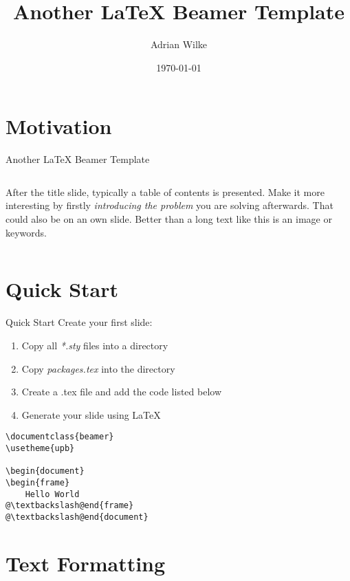 \documentclass{beamer}
\author[A.~Wilke]{Adrian Wilke}
\institute[dice]{DICE Group\\Paderborn University}
\title[Another LaTeX Beamer Template]{Another LaTeX Beamer Template}
\subtitle{}
\date{\today}
\begin{document}
\frame[plain]{\titlepage}
\addtocounter{framenumber}{-1}

\section{Motivation}

\begin{frame}{Another LaTeX Beamer Template}
	\begin{columns}[T]
		After the title slide, typically a table of contents is presented. Make it more interesting by firstly \emph{introducing the problem} you are solving afterwards. That could also be on an own slide. Better than a long text like this is an image or keywords.
		\vspace*{.2cm}
		\hypersetup{linkcolor=textblue}
		\tableofcontents
	\end{columns}
\end{frame}

\section{Quick Start}
\begin{frame}[fragile]{Quick Start}
	Create your first slide:
	\begin{enumerate}
		\item Copy all \emph{*.sty} files into a directory
		\item Copy \emph{packages.tex} into the directory
		\item Create a .tex file and add the code listed below
		\item Generate your slide using LaTeX
	\end{enumerate}
	\begin{lstlisting}[caption={Minimal Example}]
\documentclass{beamer}
\usetheme{upb}

\begin{document}
\begin{frame}
	Hello World
@\textbackslash@end{frame}
@\textbackslash@end{document}
	\end{lstlisting}
\end{frame}

\section{Text Formatting}
\end{document}
